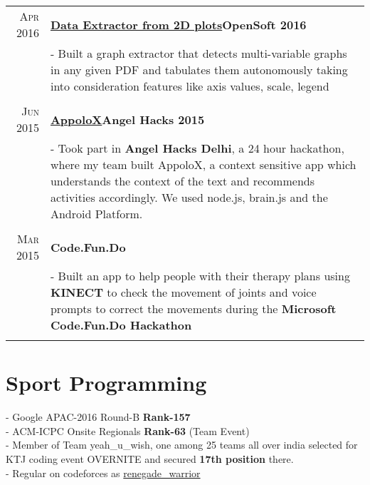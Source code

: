 \documentclass[a4paper,10pt]{extarticle} %
\begin{document}
\begin{tabular}{r|p{17cm}}


\textsc{Apr 2016} & \textbf{\href{https://github.com/sandeepkumarpani888/Opensoft-2016}{Data Extractor from 2D plots}}\hfill\textbf{OpenSoft 2016}\\
& \footnotesize{- Built a graph extractor that detects multi-variable graphs in any given PDF and tabulates them autonomously taking into consideration features like axis values, scale, legend}\\
\multicolumn{2}{c}{} \\

\textsc{Jun 2015} & \textbf{\href{https://github.com/sandeepkumarpani888/apollo-api}{AppoloX}}\hfill\textbf{Angel Hacks 2015}\\
& \footnotesize{- Took part in \textbf{Angel Hacks Delhi}, a 24 hour hackathon, where my team built AppoloX, a context sensitive app which understands the context of the text and recommends activities accordingly. We used node.js, brain.js and the Android Platform.}\\
\multicolumn{2}{c}{} \\

\textsc{Mar 2015} & \textbf{Code.Fun.Do} \\
& \footnotesize{- Built an app to help people with their therapy plans using \textbf{KINECT} to check the movement of joints and voice prompts to correct the movements during the \textbf{Microsoft Code.Fun.Do Hackathon}}\\
\multicolumn{2}{c}{} \\
\end{tabular}


\section{Sport Programming}
- Google APAC-2016 Round-B \textbf{Rank-157}\\
- ACM-ICPC Onsite Regionals \textbf{Rank-63} (Team Event)\\
- Member of Team yeah\_u\_wish, one among 25 teams all over india selected for KTJ coding event OVERNITE and secured \textbf{17th position} there.\\
- Regular on codeforces as {\href{http://codeforces.com/profile/renegade_warrior}{renegade\_warrior}}\\
\end{document}
